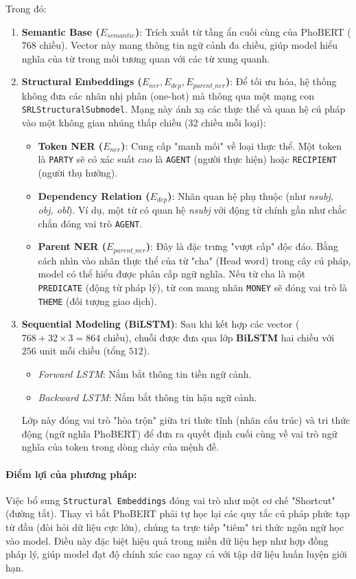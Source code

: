 Trong đó:
\begin{enumerate}
    \item \textbf{Semantic Base ($E_{semantic}$)}: Trích xuất từ tầng ẩn cuối cùng của PhoBERT ($768$ chiều). Vector này mang thông tin ngữ cảnh đa chiều, giúp model hiểu nghĩa của từ trong mối tương quan với các từ xung quanh.
    \item \textbf{Structural Embeddings ($E_{ner}, E_{dep}, E_{parent\_ner}$)}: 
    Để tối ưu hóa, hệ thống không đưa các nhãn nhị phân (one-hot) mà thông qua một mạng con \texttt{SRLStructuralSubmodel}. Mạng này ánh xạ các thực thể và quan hệ cú pháp vào một không gian nhúng thấp chiều ($32$ chiều mỗi loại):
    \begin{itemize}
        \item \textbf{Token NER ($E_{ner}$)}: Cung cấp "manh mối" về loại thực thể. Một token là \texttt{PARTY} sẽ có xác suất cao là \texttt{AGENT} (người thực hiện) hoặc \texttt{RECIPIENT} (người thụ hưởng).
        \item \textbf{Dependency Relation ($E_{dep}$)}: Nhãn quan hệ phụ thuộc (như \textit{nsubj, obj, obl}). Ví dụ, một từ có quan hệ \textit{nsubj} với động từ chính gần như chắc chắn đóng vai trò \texttt{AGENT}.
        \item \textbf{Parent NER ($E_{parent\_ner}$)}: Đây là đặc trưng "vượt cấp" độc đáo. Bằng cách nhìn vào nhãn thực thể của từ "cha" (Head word) trong cây cú pháp, model có thể hiểu được phân cấp ngữ nghĩa. Nếu từ cha là một \texttt{PREDICATE} (động từ pháp lý), từ con mang nhãn \texttt{MONEY} sẽ đóng vai trò là \texttt{THEME} (đối tượng giao dịch).
    \end{itemize}
    \item \textbf{Sequential Modeling (BiLSTM)}: 
    Sau khi kết hợp các vector ($768 + 32 \times 3 = 864$ chiều), chuỗi được đưa qua lớp \textbf{BiLSTM} hai chiều với $256$ unit mỗi chiều (tổng $512$). 
    \begin{itemize}
        \item \textit{Forward LSTM}: Nắm bắt thông tin tiền ngữ cảnh.
        \item \textit{Backward LSTM}: Nắm bắt thông tin hậu ngữ cảnh.
    \end{itemize}
    Lớp này đóng vai trò "hòa trộn" giữa tri thức tĩnh (nhãn cấu trúc) và tri thức động (ngữ nghĩa PhoBERT) để đưa ra quyết định cuối cùng về vai trò ngữ nghĩa của token trong dòng chảy của mệnh đề.
\end{enumerate}

\paragraph{Điểm lợi của phương pháp:} 
Việc bổ sung \texttt{Structural Embeddings} đóng vai trò như một cơ chế "Shortcut" (đường tắt). Thay vì bắt PhoBERT phải tự học lại các quy tắc cú pháp phức tạp từ đầu (đòi hỏi dữ liệu cực lớn), chúng ta trực tiếp "tiêm" tri thức ngôn ngữ học vào model. Điều này đặc biệt hiệu quả trong miền dữ liệu hẹp như hợp đồng pháp lý, giúp model đạt độ chính xác cao ngay cả với tập dữ liệu huấn luyện giới hạn.

